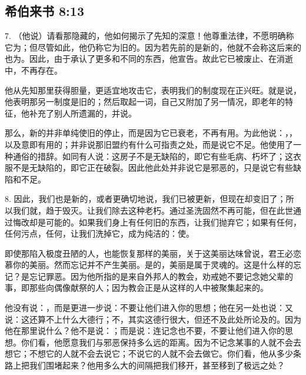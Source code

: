 
\subsection{希伯来书 8:13}

7. （他说）请看那隐藏的，他如何揭示了先知的深意！他尊重法律，不愿明确称它为；但尽管如此，他仍称它为旧的。因为若先前的是新的，他就不会称这后来的也为。因此，由于承认了更多和不同的东西，他宣告。故此它已被废止、在消逝中，不再存在。\par

他从先知那里获得胆量，更适宜地攻击它，表明我们的制度现在正兴旺。就是说，他表明那另一制度是旧的；然后取起一词，自己又附加了另一情况，即老年的特征，他补充了别人所遗漏的，并说。\par

那么，新的并非单纯使旧的停止，而是因为它已衰老，不再有用。为此他说：，，以及意即有用的；并非说那旧盟约有什么可指责之处，而是说它不足。他使用了一种通俗的措辞。如同有人说：这房子不是无缺陷的，即它有些毛病、朽坏了；这衣服不是无缺陷的，即它正在破裂。因此他此处并非说它是邪恶的，只是说它有些缺陷和不足。\par

8. 因此，我们也是新的，或者更确切地说，我们已被更新，但现在却变旧了；所以我们就，趋于毁灭。让我们除去这种老朽。通过圣洗固然不再可能，但在此世通过悔改却是可能的。如果我们身上有任何旧的东西，让我们抛弃它；如果有任何，任何污点，任何，让我们洗掉它，成为纯洁的：使。\par

即使那陷入极度丑陋的人，也能恢复那样的美丽，关于这美丽达味曾说，君王必恋慕你的美丽。然而忘记并不产生美丽。是的，美丽是属于灵魂的。这是什么样的忘记？是忘记罪恶。因为他所指的是来自外邦人的教会，劝戒她不要记念她父辈的事，即那些向偶像献祭的人；因为教会正是从这样的人中被聚集起来的。\par

他没有说：，而是更进一步说：不要让他们进入你的思想；他在另一处也说：又说：这还算不上什么大德行；不，其实这德行很大，但还不及此处所论及的。因为他在那里说什么？他不是说：；而是说：连记念也不要，不要让他们进入你的思想。你们看，他愿意我们与邪恶保持多么远的距离。因为不记念某事的人就不会去想它；不想它的人就不会去说它；不说它的人就不会去做它。你们看，他从多少条路上把我们围堵起来？他用多么大的间隔把我们移开，甚至移到了极远之处？\par

